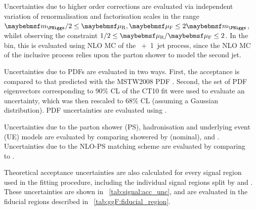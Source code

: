 Uncertainties due to higher order corrections are evaluated via independent variation of 
renormalisation and factorisation scales in the range $\mH/2 \leq \mur,\muf \leq 2\mH$, 
whilst observing the constraint $1/2 \leq \mur/\muf \leq 2$. In the \twojet bin, this is 
evaluated using NLO MC of the \ggH~+~1~jet process, since the NLO MC of the inclusive \ggH 
process relies upon the parton shower to model the second jet.

Uncertainties due to PDFs are evaluated in two ways. First, the acceptance is compared to 
that predicted with the MSTW2008 PDF \cite{MSTW}. Second, the set of PDF eigenvectors 
corresponding to 90\% CL of the CT10 fit were used to evaluate an uncertainty, 
which was then rescaled to 68\% CL (assuming a Gaussian distribution). PDF uncertainties are 
evaluated using \mcatnlo.

Uncertainties due to the parton shower (PS), hadronisation and underlying event (UE) 
models are evaluated by comparing \powhegbox showered by  (nominal),  
and \fherwig. Uncertainties due to the NLO-PS matching scheme are evaluated by comparing 
\meps{\powhegbox}{\fherwig} to \meps{\mcatnlo}{\herwigpp}.

Theoretical acceptance uncertainties are also calculated for every signal region used in 
the fitting procedure, including the individual signal regions split by \ptsubleadlep and 
\mll. These uncertainties are shown in \Table~\ref{tab:signal:acc_unc}, and are evaluated 
in the fiducial regions described in \Table~\ref{tab:ggF:fiducial_region}.

